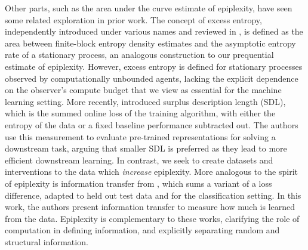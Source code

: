 \documentclass[twoside]{article}
\begin{document}
Other parts, such as the area under the curve estimate of epiplexity, have seen some related exploration in prior work. The concept of excess entropy, independently introduced under various names \citep{crutchfield1983symbolic, shaw1984dripping, grassberger1986toward} and reviewed in \citet{feldman1998information}, is defined as the area between finite-block entropy density estimates and the asymptotic entropy rate of a stationary process, an analogous construction to our prequential estimate of epiplexity. However, excess entropy is defined for stationary processes observed by computationally unbounded agents, lacking the explicit dependence on the observer's compute budget that we view as essential for the machine learning setting. More recently, \citet{whitney2020evaluating} introduced surplus description length (SDL), which is the summed online loss of the training algorithm, with either the entropy of the data or a fixed baseline performance subtracted out. The authors use this measurement to evaluate pre-trained representations for solving a downstream task, arguing that smaller SDL is preferred as they lead to more efficient downstream learning. In contrast, we seek to create datasets and interventions to the data which \emph{increase} epiplexity. More analogous to the spirit of epiplexity is information transfer from \citet{zhang2020measuring}, which sums a variant of a loss difference, adapted to held out test data and for the classification setting. In this work, the authors present information transfer to measure how much is learned from the data. Epiplexity is complementary to these works, clarifying the role of computation in defining information, and explicitly separating random and structural information.
\end{document}
